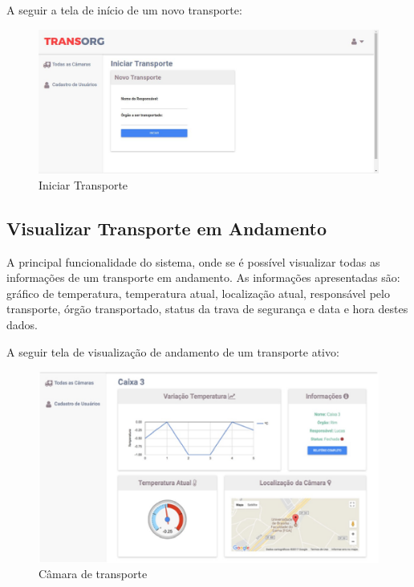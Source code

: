 	A seguir a tela de início de um novo transporte:

\begin{figure}[H]
\centering
\includegraphics[width=16cm]{figuras/iniciarTransporte_software.JPG}
\caption{Iniciar Transporte}
\end{figure}

\subsection{Visualizar Transporte em Andamento}
	A principal funcionalidade do sistema, onde se é possível visualizar todas as informações de um transporte em andamento. As informações apresentadas são: gráfico de temperatura, temperatura atual, localização atual, responsável pelo transporte, órgão transportado, status da trava de segurança e data e hora destes dados.

	A seguir tela de visualização de andamento de um transporte ativo:

\begin{figure}[H]
\centering
\includegraphics[width=16cm]{figuras/camara_software.jpg}
\caption{Câmara de transporte}
\end{figure}

